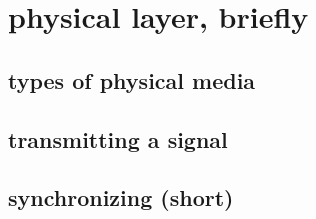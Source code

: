 
\section{physical layer, briefly}

\subsection{types of physical media}


\subsection{transmitting a signal}


\subsection{synchronizing (short)}



